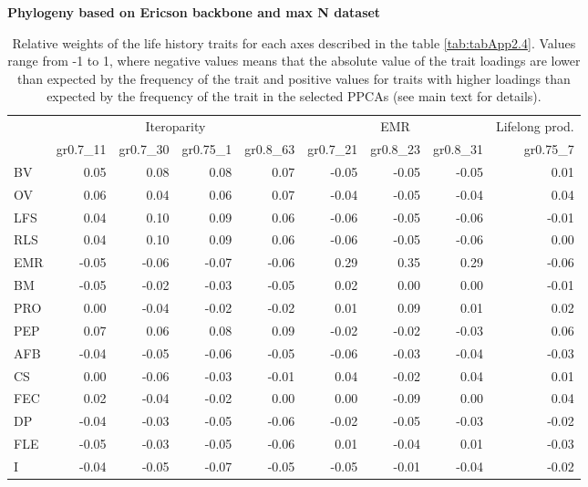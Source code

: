 \clearpage%
\begin{landscape}%
\begin{table}
\center
\caption[LHT relative importance of the alternative axes]{
Relative weights of the life history traits for each axes described in the
table \ref{tab:tabApp2.4}. Values range from -1 to 1, where negative values
means that the absolute value of the trait loadings are lower than expected by
the frequency of the trait and positive values for traits with higher loadings
than expected by the frequency of the trait in the selected PPCAs (see main
text for details).
}
\label{tab:tabApp2.6}
\begin{footnotesize}

\textbf{Phylogeny based on Ericson backbone and max N dataset}

\begin{tabular}{@{}l|rrrr|rrr|r@{}}
\toprule
 & \multicolumn{4}{c|}{Iteroparity} & \multicolumn{3}{c|}{EMR} & \multicolumn{1}{c}{Lifelong prod.}\\
 & gr0.7\_11 & gr0.7\_30 & gr0.75\_1 & gr0.8\_63 & gr0.7\_21 & gr0.8\_23 & gr0.8\_31 & gr0.75\_7\\
\midrule
BV & 0.05 & 0.08 & 0.08 & 0.07 & -0.05 & -0.05 & -0.05 & 0.01\\
OV & 0.06 & 0.04 & 0.06 & 0.07 & -0.04 & -0.05 & -0.04 & 0.04\\
LFS & 0.04 & 0.10 & 0.09 & 0.06 & -0.06 & -0.05 & -0.06 & -0.01\\
RLS & 0.04 & 0.10 & 0.09 & 0.06 & -0.06 & -0.05 & -0.06 & 0.00\\
EMR & -0.05 & -0.06 & -0.07 & -0.06 & 0.29 & 0.35 & 0.29 & -0.06\\
BM & -0.05 & -0.02 & -0.03 & -0.05 & 0.02 & 0.00 & 0.00 & -0.01\\
PRO & 0.00 & -0.04 & -0.02 & -0.02 & 0.01 & 0.09 & 0.01 & 0.02\\
PEP & 0.07 & 0.06 & 0.08 & 0.09 & -0.02 & -0.02 & -0.03 & 0.06\\
AFB & -0.04 & -0.05 & -0.06 & -0.05 & -0.06 & -0.03 & -0.04 & -0.03\\
CS & 0.00 & -0.06 & -0.03 & -0.01 & 0.04 & -0.02 & 0.04 & 0.01\\
FEC & 0.02 & -0.04 & -0.02 & 0.00 & 0.00 & -0.09 & 0.00 & 0.04\\
DP & -0.04 & -0.03 & -0.05 & -0.06 & -0.02 & -0.05 & -0.03 & -0.02\\
FLE & -0.05 & -0.03 & -0.05 & -0.06 & 0.01 & -0.04 & 0.01 & -0.03\\
I & -0.04 & -0.05 & -0.07 & -0.05 & -0.05 & -0.01 & -0.04 & -0.02\\
\bottomrule
\end{tabular}


\end{footnotesize}
\end{table}
\end{landscape}

